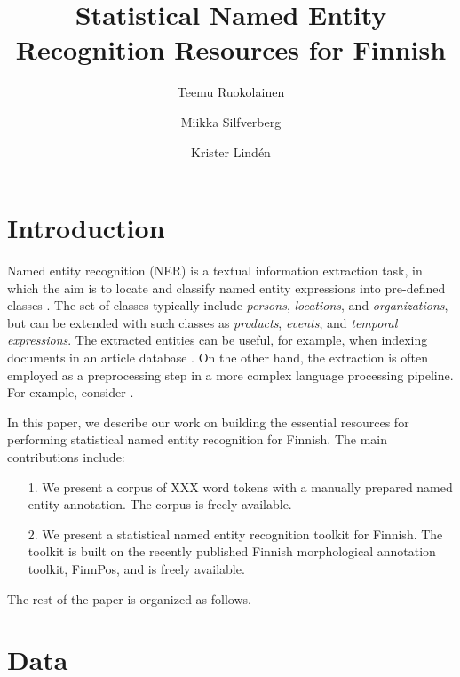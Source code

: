 \documentclass[11pt]{article}
\begin{document}
\title{Statistical Named Entity Recognition Resources for Finnish}
\author{Teemu Ruokolainen \and Miikka Silfverberg \and Krister Lind\'en}



\maketitle


\begin{abstract}
\noindent 

\end{abstract}

\section{Introduction}
\label{sec: introduction}

Named entity recognition (NER) is a textual information extraction task, in which the aim is to locate and classify named entity expressions into pre-defined classes \citep{}. The set of classes typically include \textit{persons}, \textit{locations}, and \textit{organizations}, but can be extended with such classes as \textit{products}, \textit{events}, and \textit{temporal expressions}. The extracted entities can be useful, for example, when indexing documents in an article database \citep{}. On the other hand, the extraction is often employed as a preprocessing step in a more complex language processing pipeline. For example, consider .

In this paper, we describe our work on building the essential resources for performing statistical named entity recognition for Finnish. The main contributions include:

\begin{itemize}
\item[1.] We present a corpus of XXX word tokens with a manually prepared named entity annotation. The corpus is freely available.

\item[2.] We present a statistical named entity recognition toolkit for Finnish. The toolkit is built on the recently published Finnish morphological annotation toolkit, FinnPos, and is freely available. 

\end{itemize}

The rest of the paper is organized as follows.




\section{Data}
\label{sec: data}
\end{document}
